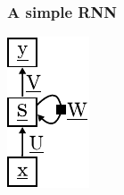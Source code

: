 \begin{frame}\frametitle{A simple RNN}
	\begin{minipage}{\textwidth}
		\begin{minipage}{0.21\textwidth}
			{\includegraphics[width=\textwidth]{img/rnn.pdf}}
		\end{minipage}	
		\hspace{0.6cm}
		\begin{minipage}{0.6\textwidth}
		

\end{minipage}
\end{minipage}
\end{frame}
